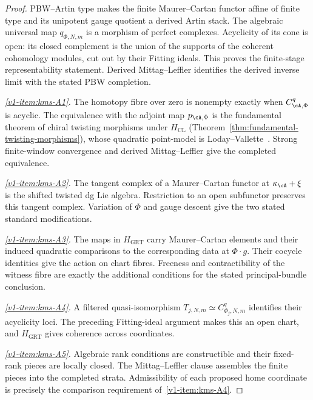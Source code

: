 \begin{proof}
PBW--Artin type makes the finite Maurer--Cartan functor affine of
finite type and its unipotent gauge quotient a derived Artin stack.
The algebraic universal map $q_{\Phi,N,m}$ is a morphism of perfect
complexes.  Acyclicity of its cone is open: its closed complement is
the union of the supports of the coherent cohomology modules, cut
out by their Fitting ideals.  This proves the finite-stage
representability statement.  Derived Mittag--Leffler identifies the
derived inverse limit with the stated PBW completion.

\emph{\ref{v1-item:kms-A1}.}
The homotopy fibre over zero is nonempty exactly when
$C^q_{\cA,\Phi}$ is acyclic.  The equivalence with the adjoint map
$p_{\cA,\Phi}$ is the fundamental theorem of chiral twisting
morphisms under $H_{\mathrm{CL}}$
(Theorem~\ref{thm:fundamental-twisting-morphisms}), whose quadratic
point-model is Loday--Vallette~\cite[Theorem~3.4.6]{LV12}.
Strong finite-window convergence and derived Mittag--Leffler give
the completed equivalence.

\emph{\ref{v1-item:kms-A2}.}
The tangent complex of a Maurer--Cartan functor at
$\kappa_\cA+\xi$ is the shifted twisted dg Lie algebra.  Restriction
to an open subfunctor preserves this tangent complex.  Variation of
$\Phi$ and gauge descent give the two stated standard modifications.

\emph{\ref{v1-item:kms-A3}.}
The maps in $H_{\mathrm{GRT}}$ carry Maurer--Cartan elements and
their induced quadratic comparisons to the corresponding data at
$\Phi\cdot g$.  Their cocycle identities give the action on chart
fibres.  Freeness and contractibility of the witness fibre are
exactly the additional conditions for the stated principal-bundle
conclusion.

\emph{\ref{v1-item:kms-A4}.}
A filtered quasi-isomorphism
$T_{j,N,m}\simeq C^q_{\Phi_j,N,m}$ identifies their acyclicity
loci.  The preceding Fitting-ideal argument makes this an open chart,
and $H_{\mathrm{GRT}}$ gives coherence across coordinates.

\emph{\ref{v1-item:kms-A5}.}
Algebraic rank conditions are constructible and their fixed-rank
pieces are locally closed.  The Mittag--Leffler clause assembles the
finite pieces into the completed strata.  Admissibility of each
proposed home coordinate is precisely the comparison requirement
of~\ref{v1-item:kms-A4}.
\end{proof}

